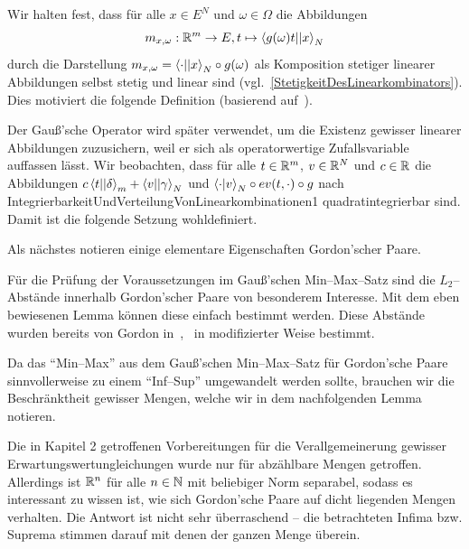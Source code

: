 \documentclass[a4paper]{report}
\numberwithin[\roman]{equation}{sat}
\begin{document}
Wir halten fest, dass für alle $x \in E^N$ und $\omega \in \Omega$ die
Abbildungen
\[m_{x,\omega} : \mathbb{R}^m \rightarrow E, t \mapsto \left\langle g(\omega)t ||x\right\rangle_N\]
durch die Darstellung $m_{x,\omega} = \left\langle \cdot ||x\right\rangle_N \circ g(\omega)$ als
Komposition stetiger linearer Abbildungen selbst stetig und linear sind
(vgl.~\ref{StetigkeitDesLinearkombinators}).\\
Dies motiviert die folgende Definition (basierend auf~\cite{Gor,Gor2}).



Der Gauß'sche Operator wird später verwendet, um die Existenz gewisser linearer
Abbildungen zuzusichern, weil er sich als operatorwertige Zufallsvariable
auffassen lässt.\parag
Wir beobachten, dass für alle $t \in \mathbb{R}^m$, $v \in \mathbb{R}^N$ und $c \in \mathbb{R}$ die
Abbildungen $c\left\langle t ||\delta\right\rangle _m + \left\langle v ||\gamma\right\rangle_N$ und
$\left\langle \cdot |v\right\rangle _N \circ ev(t, \cdot) \circ g$ nach
{IntegrierbarkeitUndVerteilungVonLinearkombinationen1} quadratintegrierbar
sind.
Damit ist die folgende Setzung wohldefiniert.


\parag
Als nächstes notieren einige elementare Eigenschaften Gordon'scher Paare.


\parag
Für die Prüfung der Voraussetzungen im Gauß'schen Min--Max--Satz sind die
$L_2$--Abstände innerhalb Gordon'scher Paare von besonderem Interesse.
Mit dem eben bewiesenen Lemma können diese einfach bestimmt werden.
Diese Abstände wurden bereits von Gordon in~\cite{Gor},~\cite{Gor2} in modifizierter Weise bestimmt.
\newpage

\parag
Da das \enquote{Min--Max} aus dem Gauß'schen Min--Max--Satz für Gordon'sche Paare
sinnvollerweise zu einem \enquote{Inf--Sup} umgewandelt werden sollte, brauchen wir
die Beschränktheit gewisser Mengen, welche wir in dem nachfolgenden Lemma
notieren.


\parag
Die in Kapitel 2 getroffenen Vorbereitungen für die Verallgemeinerung gewisser
Erwartungswertungleichungen wurde nur für abzählbare Mengen getroffen.
Allerdings ist $\mathbb{R}^n$ für alle $n \in \mathbb{N}$ mit beliebiger Norm separabel, sodass
es interessant zu wissen ist, wie sich Gordon'sche Paare auf dicht liegenden
Mengen verhalten.
Die Antwort ist nicht sehr überraschend -- die betrachteten
Infima bzw. Suprema stimmen darauf mit denen der ganzen Menge überein.
\end{document}
